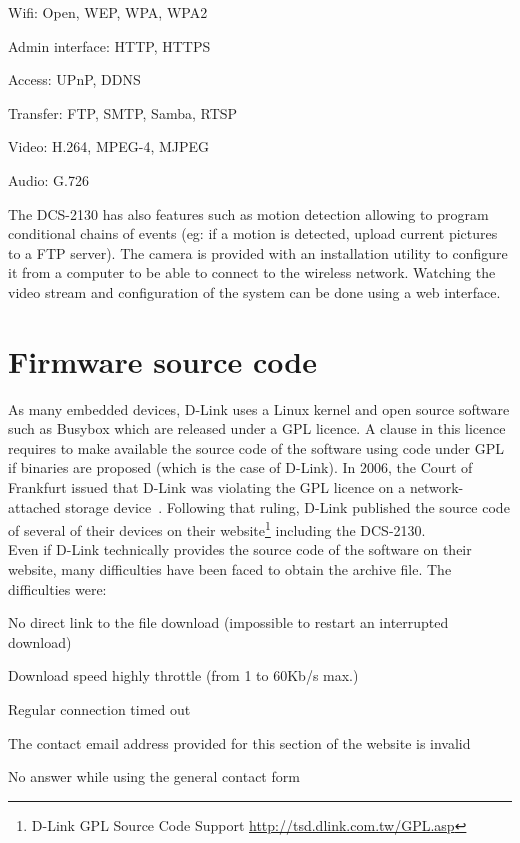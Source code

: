 \begin{itemizealt}
\item Wifi: Open, WEP, WPA, WPA2
\item Admin interface: HTTP, HTTPS
\item Access: UPnP, DDNS
\item Transfer: FTP, SMTP, Samba, RTSP
\item Video: H.264, MPEG-4, MJPEG
\item Audio: G.726
\end{itemizealt}

The DCS-2130 has also features such as motion detection allowing to program conditional chains of events (eg: if a motion is detected, upload current pictures to a FTP server).
The camera is provided with an installation utility to configure it from a computer to be able to connect to the wireless network.
Watching the video stream and configuration of the system can be done using a web interface.

\section{Firmware source code}
\label{sec:dcs-gpl}

As many embedded devices, D-Link uses a Linux kernel and open source software such as Busybox which are released under a GPL licence.
A clause in this licence requires to make available the source code of the software using code under GPL if binaries are proposed (which is the case of D-Link).
In 2006, the Court of Frankfurt issued that D-Link was violating the GPL licence on a network-attached storage device~\cite{dlink-gpl-viol}.
Following that ruling, D-Link published the source code of several of their devices on their website\footnote{D-Link GPL Source Code Support \url{http://tsd.dlink.com.tw/GPL.asp}} including the DCS-2130.\\

Even if D-Link technically provides the source code of the software on their website, many difficulties have been faced to obtain the archive file.
The difficulties were:

\begin{itemizealt}
\item No direct link to the file download (impossible to restart an interrupted download)
\item Download speed highly throttle (from 1 to 60Kb/s max.)
\item Regular connection timed out
\item The contact email address provided for this section of the website is invalid
\item No answer while using the general contact form
\end{itemizealt}

